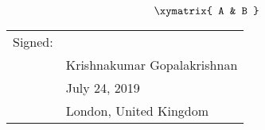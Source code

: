 \begin{equation*}
  \xymatrix{
    A & B
  }
\end{equation*}

\begin{flushright}
    \begin{tabular}{@{}p{.4in}p{2.1in}@{}}
       Signed: & \hrulefill \\
                    & Krishnakumar Gopalakrishnan \\
                    & July 24, 2019\\
                    & London, United Kingdom \\
              \end{tabular}
    \end{flushright}
